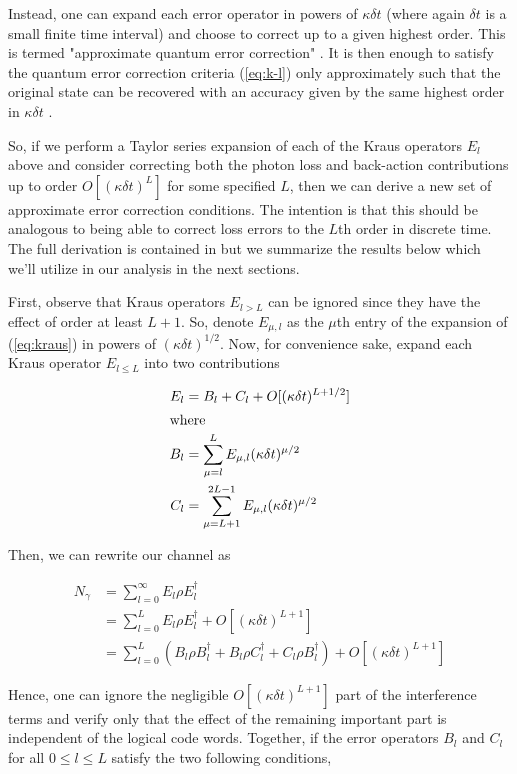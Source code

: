\documentclass[12]{amsart}
\newcommand\0{\mathbf{0}}
\newcommand\<{\langle}
\renewcommand\>{\rangle}
\begin{document}
Instead, one can expand each error operator in powers of $\kappa \delta t$ (where again $\delta t$ is a small finite time interval) and choose to correct up to a given highest order. This is termed "approximate quantum error correction" \cite{mandayam2012towards}. It is then enough to satisfy the quantum error correction criteria (\ref{eq:k-l}) only approximately such that the original state can be recovered with an accuracy given by the same highest order in $\kappa \delta t$ \cite{michael2016new}.

So, if we perform a Taylor series expansion of each of the Kraus operators $E_l$ above and consider correcting both the photon loss and back-action contributions up to order $O[(\kappa \delta t)^L]$ for some specified $L$, then we can derive a new set of approximate error correction conditions. The intention is that this should be analogous to being able to correct loss errors to the $L$th order in discrete time. The full derivation is contained in \cite{michael2016new} but we summarize the results below which we'll utilize in our analysis in the next sections.

First, observe that Kraus operators $E_{l>L}$ can be ignored since they have the effect of order at least $L+1$. So, denote $E_{\mu, l}$ as the $\mu$th entry of the expansion of (\ref{eq:kraus}) in powers of $(\kappa\delta t)^{1/2}$. Now, for convenience sake, expand each Kraus operator $E_{l \leq L}$ into two contributions

\begin{align*}
E_l &= B_l + C_l + O[(\kappa \delta t)^{L + 1/2}]	\\
\intertext{where}
B_l &= \sum_{\mu = l }^L E_{\mu, l}(\kappa \delta t)^{\mu / 2} \\
C_l &= \sum_{\mu = L+1 }^{2L - 1} E_{\mu, l}(\kappa \delta t)^{\mu / 2} \\
\end{align*}

Then, we can rewrite our channel as 

\begin{align*}
N_\gamma &= \sum_{l=0}^\infty E_l \rho E_l^\dag\\
&= \sum_{l=0}^L E_l \rho E_l^\dag + O[(\kappa \delta t)^{L + 1}] \\
&= \sum_{l=0}^L(B_l \rho B_l^\dag + B_l \rho C_l^\dag + C_l \rho B_l^\dag) + O[(\kappa \delta t)^{L + 1}]
\end{align*}

Hence, one can ignore the negligible $O[(\kappa \delta t)^{L + 1}]$ part of the interference terms and verify only that the effect of the remaining important part is independent of the logical code words. Together, if the error operators $B_l$ and $C_l$ for all $0 \leq l \leq L$ satisfy the two following conditions,
\end{document}
